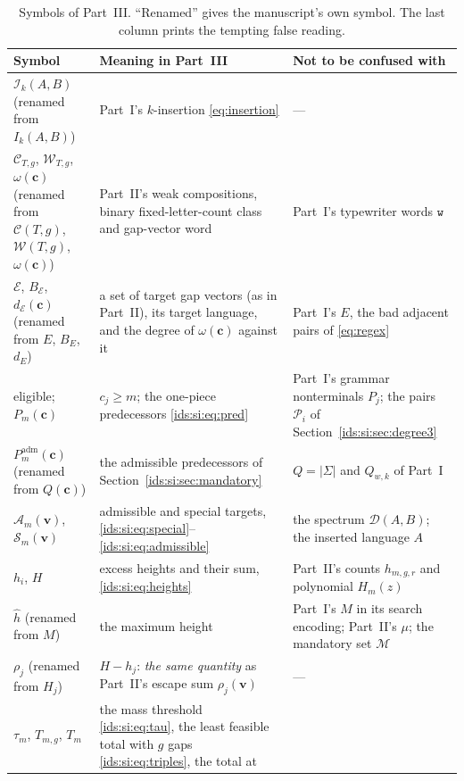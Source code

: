 \documentclass[11pt,letterpaper]{article}
\theoremstyle{definition}\newtheorem{definition}[theorem]{Definition}
\theoremstyle{remark}\newtheorem{remark}[theorem]{Remark}
\theoremstyle{definition}\newtheorem{question}[theorem]{Question}
\newcommand{\ins}[3]{\mathcal I_{#1}(#2,#3)}
\newcommand{\spec}[2]{\mathcal D(#1,#2)}
\newcommand{\word}[1]{\mathtt{#1}}
\newcommand{\bpgap}[1]{\omega(#1)}
\newcommand{\bpC}[2]{\mathcal C_{#1,#2}}
\newcommand{\bpW}[2]{\mathcal W_{#1,#2}}
\newcommand{\bpE}{\mathcal E}
\newcommand{\Adm}[1]{\mathcal A_m(#1)}
\newcommand{\bpSpecial}[1]{\mathcal S_m(#1)}
\begin{document}
\begin{table}[htbp]
\centering\small\renewcommand{\arraystretch}{1.15}
\caption{Symbols of Part~III. ``Renamed'' gives the manuscript's own symbol.
The last column prints the tempting false reading.}
\label{ids:si:tab:notation}
\begin{tabular}{>{\raggedright}p{.21\linewidth}>{\raggedright}p{.39\linewidth}>{\raggedright\arraybackslash}p{.32\linewidth}}
\toprule
Symbol & Meaning in Part~III & Not to be confused with\\
\midrule
$\ins{k}{A}{B}$ (renamed from $I_k(A,B)$) & Part~I's $k$-insertion
 \eqref{eq:insertion} & ---\\
$\bpC{T}{g}$, $\bpW{T}{g}$, $\bpgap{\mathbf c}$ (renamed from
 $\mathcal C(T,g)$, $\mathcal W(T,g)$, $\omega(\mathbf c)$) & Part~II's
 weak compositions, binary fixed-letter-count class and gap-vector word
 & Part~I's typewriter words $\word{w}$\\
$\bpE$, $B_{\bpE}$, $d_{\bpE}(\mathbf c)$ (renamed from $E$, $B_E$,
 $d_E$) & a set of target gap vectors (as in Part~II), its target language,
 and the degree of $\bpgap{\mathbf c}$ against it & Part~I's $E$, the bad
 adjacent pairs of \eqref{eq:regex}\\
eligible; $P_m(\mathbf c)$ & $c_j\geq m$; the one-piece predecessors
 \eqref{ids:si:eq:pred} & Part~I's grammar nonterminals $P_j$; the pairs
 $\mathcal P_i$ of Section~\ref{ids:si:sec:degree3}\\
$P^{\mathrm{adm}}_m(\mathbf c)$ (renamed from $Q(\mathbf c)$) & the
 admissible predecessors of Section~\ref{ids:si:sec:mandatory} & $Q=|\Sigma|$
 and $Q_{w,k}$ of Part~I\\
$\Adm{\mathbf v}$, $\bpSpecial{\mathbf v}$ & admissible and special targets,
 \eqref{ids:si:eq:special}--\eqref{ids:si:eq:admissible} & the spectrum
 $\spec{A}{B}$; the inserted language $A$\\
$h_i$, $H$ & excess heights and their sum, \eqref{ids:si:eq:heights} &
 Part~II's counts $h_{m,g,r}$ and polynomial $H_m(z)$\\
$\hat h$ (renamed from $M$) & the maximum height & Part~I's $M$ in its search
 encoding; Part~II's $\mu$; the mandatory set $\mathcal M$\\
$\rho_j$ (renamed from $H_j$) & $H-h_j$: \emph{the same quantity} as Part~II's
 escape sum $\rho_j(\mathbf v)$ & ---\\
$\tau_m$, $T_{m,g}$, $T_m$ & the mass threshold \eqref{ids:si:eq:tau}, the
 least feasible total with $g$ gaps \eqref{ids:si:eq:triples}, the total at

\end{tabular}
\end{table}
\end{document}
